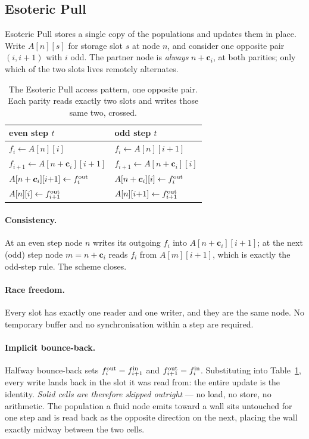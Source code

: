 \documentclass[11pt,a4paper]{article}
\newcommand{\ci}{\bm{c}_i}
\begin{document}
\subsection{Esoteric Pull}
\label{sec:esopull}

Esoteric Pull \cite{lehmann2022} stores a single copy of the populations and
updates them in place. Write $A[n][s]$ for storage slot $s$ at node $n$, and
consider one opposite pair $(i,i+1)$ with $i$ odd. The partner node is
\emph{always} $n+\ci$, at both parities; only which of the two slots lives
remotely alternates.

\begin{table}[h]
\centering\small
\begin{tabular}{ll}
\toprule
even step $t$ & odd step $t$ \\
\midrule
$f_i \leftarrow A[n][i]$              & $f_i \leftarrow A[n][i{+}1]$ \\
$f_{i+1} \leftarrow A[n+\ci][i{+}1]$  & $f_{i+1} \leftarrow A[n+\ci][i]$ \\
$A[n+\ci][i{+}1] \leftarrow f_i^{\rm out}$ & $A[n+\ci][i] \leftarrow f_i^{\rm out}$ \\
$A[n][i] \leftarrow f_{i+1}^{\rm out}$     & $A[n][i{+}1] \leftarrow f_{i+1}^{\rm out}$ \\
\bottomrule
\end{tabular}
\caption{The Esoteric Pull access pattern, one opposite pair. Each parity reads
exactly two slots and writes those same two, crossed.}
\label{tab:esopull}
\end{table}

\paragraph{Consistency.} At an even step node $n$ writes its outgoing $f_i$ into
$A[n+\ci][i{+}1]$; at the next (odd) step node $m=n+\ci$ reads $f_i$ from
$A[m][i{+}1]$, which is exactly the odd-step rule. The scheme closes.

\paragraph{Race freedom.} Every slot has exactly one reader and one writer, and
they are the same node. No temporary buffer and no synchronisation within a step
are required.

\paragraph{Implicit bounce-back.} Halfway bounce-back sets
$f_i^{\rm out}=f_{i+1}^{\rm in}$ and $f_{i+1}^{\rm out}=f_i^{\rm in}$.
Substituting into Table~\ref{tab:esopull}, every write lands back in the slot it
was read from: the entire update is the identity. \emph{Solid cells are therefore
skipped outright} --- no load, no store, no arithmetic. The population a fluid
node emits toward a wall sits untouched for one step and is read back as the
opposite direction on the next, placing the wall exactly midway between the two
cells.
\end{document}
